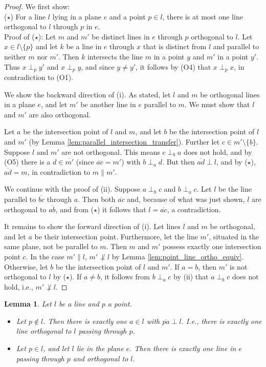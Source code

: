 \documentclass[11pt,a4paper]{article}
\newcommand{\ortho}[3]{#1 \perp_{#2} #3}
\newcommand{\lineab}[1]{\overline{#1}}
\newtheorem{lemma}[theorem]{Lemma}
\begin{document}
\begin{proof}
We first show: \\
($\star$) For a line $l$ lying in a plane $e$ and a point $p \in l$, there is at most one line orthogonal to $l$ through $p$ in $e$. \\
Proof of ($\star$): Let $m$ and $m'$ be distinct lines in $e$ through $p$ orthogonal to $l$. Let $x \in l \setminus \{p\}$ and let $k$ be a line in $e$ through $x$ that is distinct from $l$ and parallel to neither $m$ nor $m'$. Then $k$ intersects the line $m$ in a point $y$ and $m'$ in a point $y'$. Thus $\ortho{x}{p}{y'}$ and $\ortho{x}{p}{y}$, and since $y \neq y'$, it follows by (O4) that $\ortho{x}{p}{x}$, in contradiction to (O1).

We show the backward direction of (i). As stated, let $l$ and $m$ be orthogonal lines in a plane $e$, and let $m'$ be another line in $e$ parallel to $m$. We must show that $l$ and $m'$ are also orthogonal.

Let $a$ be the intersection point of $l$ and $m$, and let $b$ be the intersection point of $l$ and $m'$ (by Lemma \ref{lem:parallel_intersection_transfer}). Further let $c \in m' \setminus \{b\}$. Suppose $l$ and $m'$ are not orthogonal. This means $\ortho{c}{b}{a}$ does not hold, and by (O5) there is a $d \in \lineab{m'}$ (since $\lineab{ac} = m'$) with $\ortho{b}{a}{d}$. But then $\lineab{ad} \perp l$, and by ($\star$), $\lineab{ad} = m$, in contradiction to $m \parallel m'$.

We continue with the proof of (ii). Suppose $\ortho{a}{b}{c}$ and $\ortho{b}{a}{c}$. Let $l$ be the line parallel to $\lineab{bc}$ through $a$. Then both $\lineab{ac}$ and, because of what was just shown, $l$ are orthogonal to $\lineab{ab}$, and from ($\star$) it follows that $l = \lineab{ac}$, a contradiction.

It remains to show the forward direction of (i). Let lines $l$ and $m$ be orthogonal, and let $a$ be their intersection point. Furthermore, let the line $m'$, situated in the same plane, not be parallel to $m$. Then $m$ and $m'$ possess exactly one intersection point $c$. In the case $m' \parallel l$, $m' \not\perp l$ by Lemma \ref{lem:point_line_ortho_equiv}. Otherwise, let $b$ be the intersection point of $l$ and $m'$. If $a = b$, then $m'$ is not orthogonal to $l$ by ($\star$). If $a \neq b$, it follows from $\ortho{b}{a}{c}$ by (ii) that $\ortho{a}{b}{c}$ does not hold, i.e., $m' \not\perp l$.
\end{proof}

\begin{lemma} \label{lem:ortho_projection}
Let $l$ be a line and $p$ a point.
\begin{itemize}
    \item[(i)] Let $p \notin l$. Then there is exactly one $a \in l$ with $\lineab{pa} \perp l$. I.e., there is exactly one line orthogonal to $l$ passing through $p$.
    \item[(ii)] Let $p \in l$, and let $l$ lie in the plane $e$. Then there is exactly one line in $e$ passing through $p$ and orthogonal to $l$.
\end{itemize}
\end{lemma}
\end{document}
